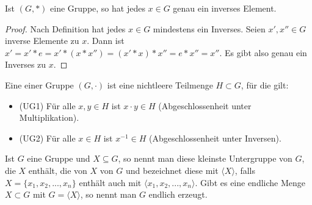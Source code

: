 \begin{proposition}
	Ist $(G,*)$ eine Gruppe, so hat jedes $x \in G$ genau ein inverses Element.
\end{proposition}
\begin{proof}
	Nach Definition hat jedes $x\in G$ mindestens ein Inverses. Seien $x',x''\in G$ inverse Elemente zu $x$. Dann ist 
	$x'=x'*e=x'*(x*x'')=(x'*x)*x''=e*x''=x''$. Es gibt also genau ein Inverses zu $x$.
\end{proof}

\begin{definition}[Untergruppe]
	Eine  einer Gruppe $(G,\cdot)$ ist eine 
	nichtleere Teilmenge $H \subset G$, für die gilt:
	\begin{itemize}
		\item (UG1) Für alle $x,y \in H$ ist $x \cdot y \in H$ (Abgeschlossenheit unter Multiplikation).
		\item (UG2) Für alle $x \in H$ ist $x^{-1} \in H$ (Abgeschlossenheit unter Inversen).
	\end{itemize}
\end{definition}

\begin{definition}
	Ist $G$ eine Gruppe und $X \subseteq G$, so nennt man diese
	kleinste Untergruppe von $G$, die $X$ enthält, die von $X$  von $G$ und
	bezeichnet diese mit $\langle X\rangle$, falls $X = \{x_1,x_2,...,x_n\}$ enthält auch mit $\langle x_1,x_2,
	...,x_n\rangle$. Gibt es eine endliche Menge $X \subset G$ mit $G=\langle X\rangle$, so nennt man $G$ endlich
	erzeugt.
\end{definition}
